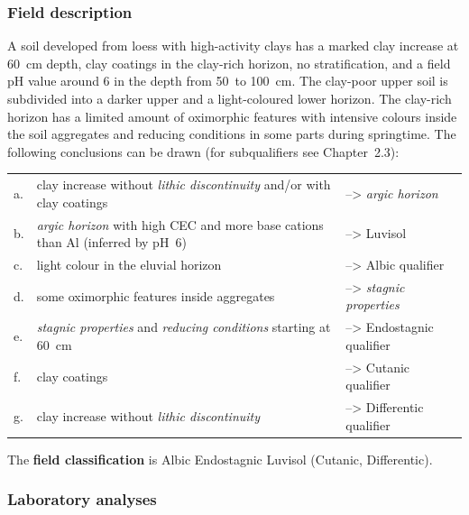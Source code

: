 \documentclass[
  letterpaper,
  DIV=11,
  numbers=noendperiod]{scrreprt}
\begin{document}
\hypertarget{field-description}{%
\subsubsection{Field description}\label{field-description}}

A soil developed from loess with high-activity clays has a marked clay
increase at 60~cm depth, clay coatings in the clay-rich horizon, no
stratification, and a field pH value around 6 in the depth from 50~to
100~cm. The clay-poor upper soil is subdivided into a darker upper and a
light-coloured lower horizon. The clay-rich horizon has a limited amount
of oximorphic features with intensive colours inside the soil aggregates
and reducing conditions in some parts during springtime. The following
conclusions can be drawn (for subqualifiers see Chapter~2.3):

\begin{longtable}[]{@{}
  >{\raggedright\arraybackslash}p{}
  >{\raggedright\arraybackslash}p{}
  >{\raggedright\arraybackslash}p{}@{}}
\toprule()
\endhead
a. & clay increase without \emph{lithic discontinuity} and/or with clay
coatings & --\textgreater{} \emph{argic horizon} \\
b. & \emph{argic horizon} with high CEC and more base cations than Al
(inferred by pH~6) & --\textgreater{} Luvisol \\
c. & light colour in the eluvial horizon & --\textgreater{} Albic
qualifier \\
d. & some oximorphic features inside aggregates & --\textgreater{}
\emph{stagnic properties} \\
e. & \emph{stagnic properties} and \emph{reducing conditions} starting
at 60~cm & --\textgreater{} Endostagnic qualifier \\
f. & clay coatings & --\textgreater{} Cutanic qualifier \\
g. & clay increase without \emph{lithic discontinuity} &
--\textgreater{} Differentic qualifier \\
\bottomrule()
\end{longtable}

The \textbf{field classification} is Albic Endostagnic Luvisol (Cutanic,
Differentic).

\hypertarget{laboratory-analyses}{%
\subsubsection{Laboratory analyses}\label{laboratory-analyses}}
\end{document}
